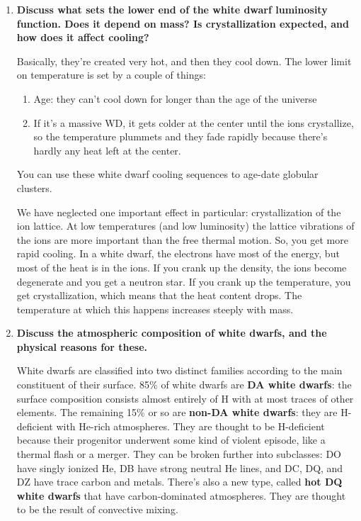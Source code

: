 \documentclass[a4paper]{article}
\begin{document}
\begin{enumerate}
\item \textbf{Discuss what sets the lower end of the white dwarf luminosity function. Does it depend on mass? Is crystallization expected, and how does it affect cooling?}

Basically, they're created very hot, and then they cool down. The lower limit on temperature is set by a couple of things:

\begin{enumerate}
\item Age: they can't cool down for longer than the age of the universe
\item If it's a massive WD, it gets colder at the center until the ions crystallize, so the temperature plummets and they fade rapidly because there's hardly any heat left at the center. 
\end{enumerate}

You can use these white dwarf cooling sequences to age-date globular clusters. 

We have neglected one important effect in particular: crystallization of the ion lattice. At low temperatures (and low luminosity) the lattice vibrations of the ions are more important than the free thermal motion. So, you get more rapid cooling. 
In a white dwarf, the electrons have most of the energy, but most of the heat is in the ions. 
If you crank up the density, the ions become degenerate and you get a neutron star. If you crank up the temperature, you get crystallization, which means that the heat content drops. The temperature at which this happens increases steeply with mass. 

\item \textbf{Discuss the atmospheric composition of white dwarfs, and the physical reasons for these.}

White dwarfs are classified into two distinct families according to the main constituent of their surface. 85\% of white dwarfs are \textbf{DA white dwarfs}: the surface composition consists almost entirely of H with at most traces of other elements. The remaining 15\% or so are \textbf{non-DA white dwarfs}: they are H-deficient with He-rich atmospheres. They are thought to be H-deficient because their progenitor underwent some kind of violent episode, like a thermal flash or a merger. They can be broken further into subclasses: DO have singly ionized He, DB have strong neutral He lines, and DC, DQ, and DZ have trace carbon and metals. There's also a new type, called \textbf{hot DQ white dwarfs} that have carbon-dominated atmospheres. They are thought to be the result of convective mixing. 


\end{enumerate}
\end{document}
